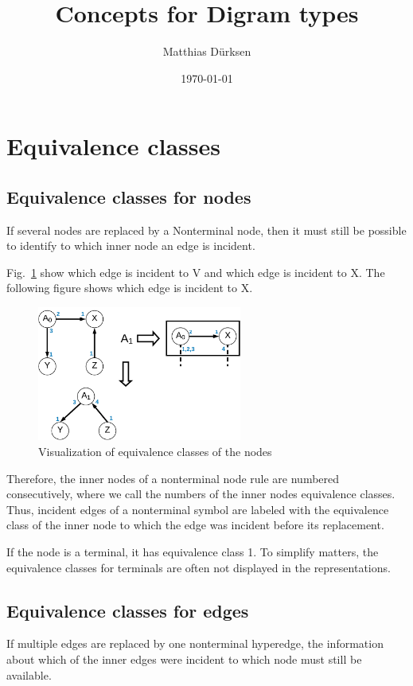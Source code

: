 \documentclass[a4paper]{scrartcl}
\title{Concepts for Digram types}
\author{Matthias Dürksen}
\date{\today}
\begin{document}
\maketitle
\section*{Equivalence classes}
\subsection*{Equivalence classes for nodes}

If several nodes are replaced by a Nonterminal node, then it must still be possible to identify to which inner node an edge is incident.

Fig.~\ref{fig:nodeEC} show which edge is incident to V and which edge is incident to X. The following figure shows which edge is incident to X.
\begin{figure}[h]
	\centering
	\includegraphics[width=0.6\textwidth]{img/nodeEC}
	\caption{Visualization of equivalence classes of the nodes}
	\label{fig:nodeEC}
\end{figure}

Therefore, the inner nodes of a nonterminal node rule are numbered consecutively, where we call the numbers of the inner nodes equivalence classes. Thus, incident edges of a nonterminal symbol are labeled with the equivalence class of the inner node to which the edge was incident before its replacement. 

If the node is a terminal, it has equivalence class 1. To simplify matters, the equivalence classes for terminals are often not displayed in the representations.

\subsection*{Equivalence classes for edges}
If multiple edges are replaced by one nonterminal hyperedge, the information about which of the inner edges were incident to which node must still be available.
\end{document}
